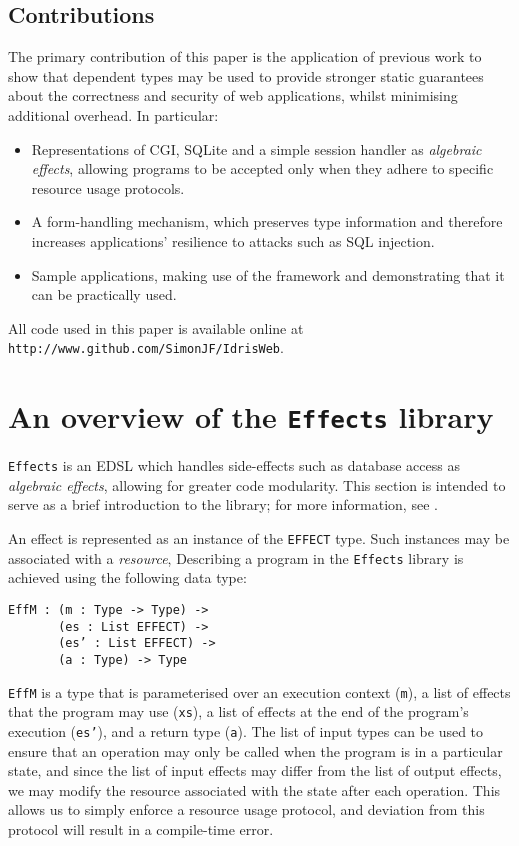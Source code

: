 \documentclass[preprint]{sigplanconf}
\begin{document}
\subsection{Contributions}
The primary contribution of this paper is the application of previous work to show that dependent types may be used to provide stronger static guarantees about the correctness and security of web applications, whilst minimising additional overhead. In particular:

\begin{itemize}
\item Representations of CGI, SQLite and a simple session handler as \textit{algebraic effects}, allowing programs to be accepted only when they adhere to specific resource usage protocols.
\item A form-handling mechanism, which preserves type information and therefore increases applications' resilience to attacks such as SQL injection.
\item Sample applications, making use of the framework and demonstrating that it can be practically used.
\end{itemize}

All code used in this paper is available online at \\ \verb+http://www.github.com/SimonJF/IdrisWeb+.

\section{An overview of the \texttt{Effects} library}
\texttt{Effects} \cite{effects} is an EDSL which handles side-effects such as database access as \textit{algebraic effects}, allowing for greater code modularity. This section is intended to serve as a brief introduction to the library; for more information, see \cite{effects}.

An effect is represented as an instance of the \texttt{EFFECT} type. Such instances may be associated with a \textit{resource}, 
Describing a program in the \texttt{Effects} library is achieved using the following data type:
{\small
\begin{verbatim}
EffM : (m : Type -> Type) ->
       (es : List EFFECT) ->
       (es’ : List EFFECT) ->
       (a : Type) -> Type
\end{verbatim}
}
\texttt{EffM} is a type that is parameterised over an execution context (\texttt{m}), a list of effects that the program may use (\texttt{xs}), a list of effects at the end of the program's execution (\texttt{es'}), and a return type (\texttt{a}). The list of input types can be used to ensure that an operation may only be called when the program is in a particular state, and since the list of input effects may differ from the list of output effects, we may modify the resource associated with the state after each operation. This allows us to simply enforce a resource usage protocol, and deviation from this protocol will result in a compile-time error.
\end{document}
